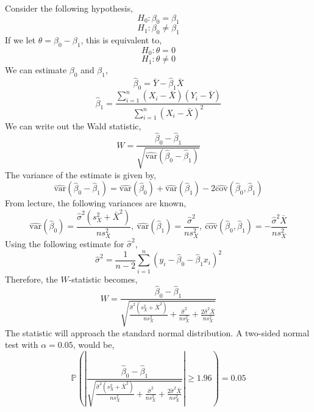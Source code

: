 \documentclass[12pt,twoside]{article}
\begin{document}
\begin{problems}
Consider the following hypothesis,
$$ H_0 : \beta_0 = \beta_1 $$
$$ H_1 : \beta_0 \neq \beta_1 $$
If we let $\theta = \beta_0 - \beta_1$, this is equivalent to,
$$ H_0 : \theta = 0 $$
$$ H_1 : \theta \neq 0 $$
We can estimate $\beta_0$ and $\beta_1$,
$$ \hat{\beta}_0 = \bar{Y} - \hat{\beta}_1 \bar{X} $$
$$ \hat{\beta}_1 = \frac{\sum_{i = 1}^n (X_i - \bar{X})(Y_i -
\bar{Y})}{\sum_{i = 1}^n (X_i - \bar{X})^2} $$
We can write out the Wald statistic,
$$ W = \frac{\hat{\beta}_0 -
\hat{\beta}_1}{\sqrt{\hat{\mathrm{var}}(\hat{\beta}_0 - \hat{\beta}_1)}} $$
The variance of the estimate is given by,
$$ \hat{\mathrm{var}}(\hat{\beta}_0 - \hat{\beta}_1) =
\hat{\mathrm{var}}(\hat{\beta}_0) + \hat{\mathrm{var}}(\hat{\beta}_1) - 2
\hat{\mathrm{cov}}(\hat{\beta}_0, \hat{\beta}_1) $$
From lecture, the following variances are known,
$$ \hat{\mathrm{var}}(\hat{\beta}_0) = \frac{\hat{\sigma}^2(s_X^2 +
\bar{X}^2)}{n s_X^2},\ \hat{\mathrm{var}}(\hat{\beta}_1) =
\frac{\hat{\sigma}^2}{n s_X^2},\ \hat{\mathrm{cov}}(\hat{\beta}_0,
\hat{\beta}_1) = - \frac{\hat{\sigma}^2 \bar{X}}{n s_X^2} $$
Using the following estimate for $\hat{\sigma}^2$,
$$ \hat{\sigma}^2 = \frac{1}{n - 2} \sum_{i = 1}^n (y_i - \hat{\beta}_0 -
\hat{\beta}_1 x_i)^2 $$
Therefore, the $W$-statistic becomes,
$$ W = \frac{\hat{\beta}_0 - \hat{\beta}_1}{\sqrt{\frac{\hat{\sigma}^2(s_X^2
+ \bar{X}^2)}{n s_X^2} + \frac{\hat{\sigma}^2}{n s_X^2} + \frac{2
\hat{\sigma}^2 \bar{X}}{n s_X^2}}} $$
The statistic will approach the standard normal distribution. A two-sided
normal test with $\alpha = 0.05$, would be,
$$ \boxed{\mathbb{P}\left(\left|\frac{\hat{\beta}_0 -
\hat{\beta}_1}{\sqrt{\frac{\hat{\sigma}^2(s_X^2 + \bar{X}^2)}{n s_X^2} +
\frac{\hat{\sigma}^2}{n s_X^2} + \frac{2 \hat{\sigma}^2 \bar{X}}{n
s_X^2}}}\right| \geq 1.96\right) = 0.05} $$

\end{problems}
\end{document}
